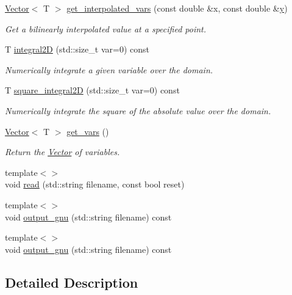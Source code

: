 \begin{DoxyCompactItemize}
\hyperlink{classLuna_1_1Vector}{Vector}$<$ T $>$ \hyperlink{classLuna_1_1Mesh2D_aac2ab4028e87cb380f7e23a81e5c5c6e}{get\+\_\+interpolated\+\_\+vars} (const double \&x, const double \&\hyperlink{ODE__BVP__test_8cpp_adf764cbdea00d65edcd07bb9953ad2b7ae1f9fdb8b786c63efc4ce44eeacd17f2}{y})
\begin{DoxyCompactList}\small\item\em Get a bilinearly interpolated value at a specified point. \end{DoxyCompactList}\item 
T \hyperlink{classLuna_1_1Mesh2D_a32772d3c7093a5e3c1919e589ccdd810}{integral2D} (std\+::size\+\_\+t var=0) const
\begin{DoxyCompactList}\small\item\em Numerically integrate a given variable over the domain. \end{DoxyCompactList}\item 
T \hyperlink{classLuna_1_1Mesh2D_a41e9d12ae3f05af7a12cd05690fff29c}{square\+\_\+integral2D} (std\+::size\+\_\+t var=0) const
\begin{DoxyCompactList}\small\item\em Numerically integrate the square of the absolute value over the domain. \end{DoxyCompactList}\item 
\hyperlink{classLuna_1_1Vector}{Vector}$<$ T $>$ \hyperlink{classLuna_1_1Mesh2D_a6c01996a6cafd29b513811de33fd323c}{get\+\_\+vars} ()
\begin{DoxyCompactList}\small\item\em Return the \hyperlink{classLuna_1_1Vector}{Vector} of variables. \end{DoxyCompactList}\item 
{\footnotesize template$<$$>$ }\\void \hyperlink{classLuna_1_1Mesh2D_acf187c6339ea8527fa70f2d5e74abe41}{read} (std\+::string filename, const bool reset)
\item 
{\footnotesize template$<$$>$ }\\void \hyperlink{classLuna_1_1Mesh2D_ab5cffc3cb5b8424b11154cb35b98dbf3}{output\+\_\+gnu} (std\+::string filename) const
\item 
{\footnotesize template$<$$>$ }\\void \hyperlink{classLuna_1_1Mesh2D_a4b2240afef17ec91c1d926bb56e1f92f}{output\+\_\+gnu} (std\+::string filename) const
\end{DoxyCompactItemize}


\subsection{Detailed Description}
